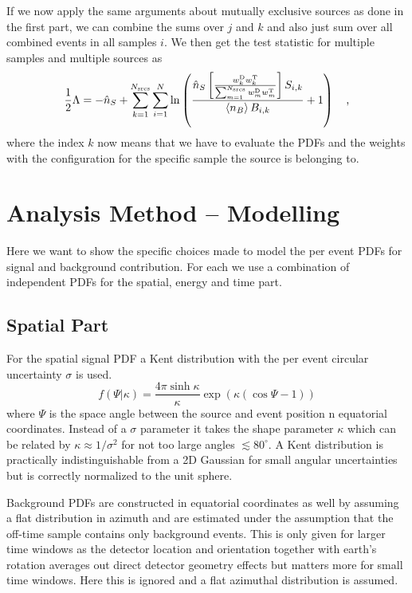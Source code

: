 If we now apply the same arguments about mutually exclusive sources as done in the first part, we can combine the sums over $j$ and $k$ and also just sum over all combined events in all samples $i$.
We then get the test statistic for multiple samples and multiple sources as
\begin{equation}
  \frac{1}{2}\Lambda
  = -\hat{n}_S + \sum_{k=1}^{N_\text{srcs}}\sum_{i=1}^{N} \ln\left(
        \frac{\hat{n}_S \left[
                \frac{ w_k^\text{D}w_k^\text{T} }
                     {\sum_{m=1}^{N_\text{srcs}} w^\text{D}_m w^\text{T}_m}
                \right] S_{i,k}}
             {\Braket{n_B} B_{i, k}} + 1 \right)
   \quad\text{,}
   \label{equ:multi_stack}
\end{equation}
where the index $k$ now means that we have to evaluate the PDFs and the weights with the configuration for the specific sample the source is belonging to.



\section{Analysis Method – Modelling}
Here we want to show the specific choices made to model the per event PDFs for signal and background contribution.
For each we use a combination of independent PDFs for the spatial, energy and time part.

\subsection{Spatial Part}
For the spatial signal PDF a Kent distribution with the per event circular uncertainty $\sigma$ is used.
\begin{equation}
  f(\Psi | \kappa) = \frac{4\pi\sinh\kappa}{\kappa}
    \exp\left(\kappa (\cos\Psi - 1)\right)
\end{equation}
where $\Psi$ is the space angle between the source and event position n equatorial coordinates.
Instead of a $\sigma$ parameter it takes the shape parameter $\kappa$ which can be related by $\kappa \approx 1 / \sigma^2$ for not too large angles $\lesssim 80^\circ$.
A Kent distribution is practically indistinguishable from a 2D Gaussian for small angular uncertainties but is correctly normalized to the unit sphere.

Background PDFs are constructed in equatorial coordinates as well by assuming a flat distribution in azimuth and are estimated under the assumption that the off-time sample contains only background events.
This is only given for larger time windows as the detector location and orientation together with earth's rotation averages out direct detector geometry effects but matters more for small time windows.
Here this is ignored and a flat azimuthal distribution is assumed.

